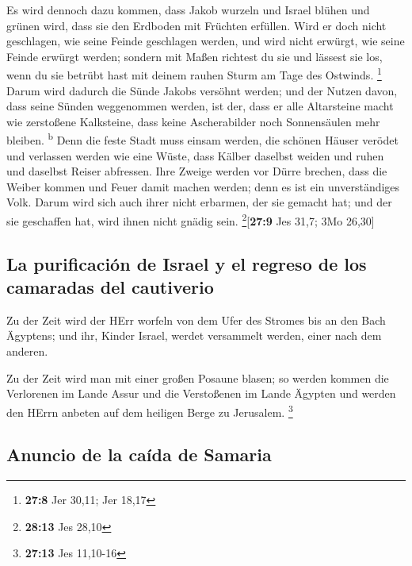  Es wird dennoch dazu kommen, dass Jakob wurzeln und
Israel blühen und grünen wird, dass sie den Erdboden mit Früchten
erfüllen.  Wird er doch nicht geschlagen, wie seine Feinde
geschlagen werden, und wird nicht erwürgt, wie seine Feinde erwürgt
werden;  sondern mit Maßen richtest du sie und lässest sie
los, wenn du sie betrübt hast mit deinem rauhen Sturm am Tage des
Ostwinds. \footnote{\textbf{27:8} Jer 30,11; Jer 18,17} 
Darum wird dadurch die Sünde Jakobs versöhnt werden; und der Nutzen
davon, dass seine Sünden weggenommen werden, ist der, dass er alle
Altarsteine macht wie zerstoßene Kalksteine, dass keine Ascherabilder
noch Sonnensäulen mehr bleiben. \textsuperscript{b}  Denn
die feste Stadt muss einsam werden, die schönen Häuser verödet und
verlassen werden wie eine Wüste, dass Kälber daselbst weiden und ruhen
und daselbst Reiser abfressen.  Ihre Zweige werden vor
Dürre brechen, dass die Weiber kommen und Feuer damit machen werden;
denn es ist ein unverständiges Volk. Darum wird sich auch ihrer nicht
erbarmen, der sie gemacht hat; und der sie geschaffen hat, wird ihnen
nicht gnädig sein. \footnote{\textbf{28:13} Jes 28,10}{[}\textbf{27:9}
Jes 31,7; 3Mo 26,30{]}

\hypertarget{la-purificaciuxf3n-de-israel-y-el-regreso-de-los-camaradas-del-cautiverio}{%
\subsection{La purificación de Israel y el regreso de los camaradas del
cautiverio}\label{la-purificaciuxf3n-de-israel-y-el-regreso-de-los-camaradas-del-cautiverio}}

 Zu der Zeit wird der HErr worfeln von dem Ufer des
Stromes bis an den Bach Ägyptens; und ihr, Kinder Israel, werdet
versammelt werden, einer nach dem anderen.

 Zu der Zeit wird man mit einer großen Posaune blasen; so
werden kommen die Verlorenen im Lande Assur und die Verstoßenen im Lande
Ägypten und werden den HErrn anbeten auf dem heiligen Berge zu
Jerusalem. \footnote{\textbf{27:13} Jes 11,10-16}

\hypertarget{anuncio-de-la-cauxedda-de-samaria}{%
\subsection{Anuncio de la caída de
Samaria}\label{anuncio-de-la-cauxedda-de-samaria}}

